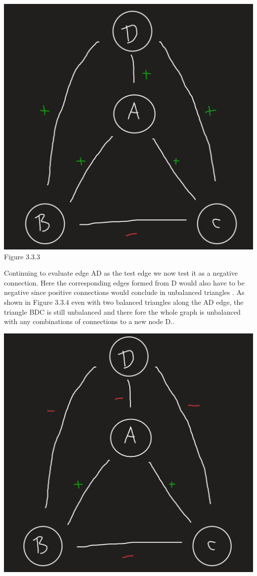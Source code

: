\documentclass[11pt]{article}
\begin{document}
{\begin{enumerate}[(a)]
\begin{center}
	\includegraphics[scale=0.5]{Figure_3_3_3}\\
	Figure 3.3.3\\
\end{center}
Continuing to evaluate edge AD as the test edge we now test it as a negative connection. Here the corresponding edges formed from D would also have to be negative since positive connections would conclude in unbalanced triangles .  As shown in Figure 3.3.4 even with two balanced triangles along the AD edge, the triangle BDC is still unbalanced and there fore the whole graph is unbalanced with any combinations of connections to a new node D.. 
\begin{center}
	\includegraphics[scale=0.5]{Figure_3_3_4}\\

\end{center}
\end{enumerate}}
\end{document}
